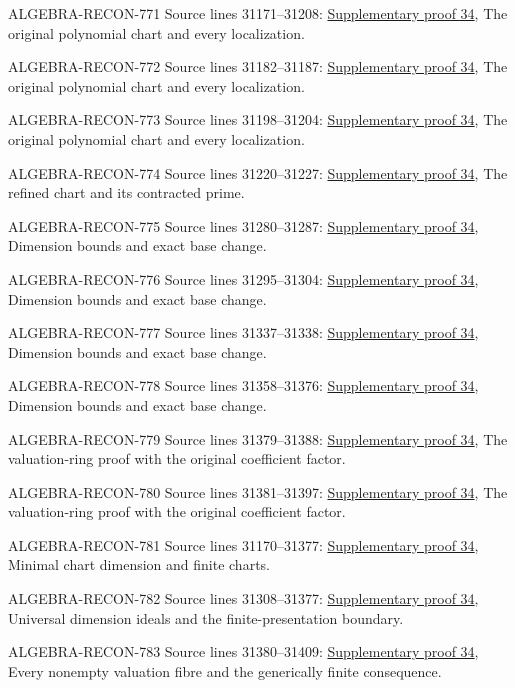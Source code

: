 \begin{AlgebraSourceRoutes}
\item[ALGEBRA-RECON-771] Source lines 31171--31208: \hyperlink{algebra_fibre_dimension_notes_20260928}{Supplementary proof 34}, The original polynomial chart and every localization.
\item[ALGEBRA-RECON-772] Source lines 31182--31187: \hyperlink{algebra_fibre_dimension_notes_20260928}{Supplementary proof 34}, The original polynomial chart and every localization.
\item[ALGEBRA-RECON-773] Source lines 31198--31204: \hyperlink{algebra_fibre_dimension_notes_20260928}{Supplementary proof 34}, The original polynomial chart and every localization.
\item[ALGEBRA-RECON-774] Source lines 31220--31227: \hyperlink{algebra_fibre_dimension_notes_20260928}{Supplementary proof 34}, The refined chart and its contracted prime.
\item[ALGEBRA-RECON-775] Source lines 31280--31287: \hyperlink{algebra_fibre_dimension_notes_20260928}{Supplementary proof 34}, Dimension bounds and exact base change.
\item[ALGEBRA-RECON-776] Source lines 31295--31304: \hyperlink{algebra_fibre_dimension_notes_20260928}{Supplementary proof 34}, Dimension bounds and exact base change.
\item[ALGEBRA-RECON-777] Source lines 31337--31338: \hyperlink{algebra_fibre_dimension_notes_20260928}{Supplementary proof 34}, Dimension bounds and exact base change.
\item[ALGEBRA-RECON-778] Source lines 31358--31376: \hyperlink{algebra_fibre_dimension_notes_20260928}{Supplementary proof 34}, Dimension bounds and exact base change.
\item[ALGEBRA-RECON-779] Source lines 31379--31388: \hyperlink{algebra_fibre_dimension_notes_20260928}{Supplementary proof 34}, The valuation-ring proof with the original coefficient factor.
\item[ALGEBRA-RECON-780] Source lines 31381--31397: \hyperlink{algebra_fibre_dimension_notes_20260928}{Supplementary proof 34}, The valuation-ring proof with the original coefficient factor.
\item[ALGEBRA-RECON-781] Source lines 31170--31377: \hyperlink{algebra_fibre_dimension_notes_20260928}{Supplementary proof 34}, Minimal chart dimension and finite charts.
\item[ALGEBRA-RECON-782] Source lines 31308--31377: \hyperlink{algebra_fibre_dimension_notes_20260928}{Supplementary proof 34}, Universal dimension ideals and the finite-presentation boundary.
\item[ALGEBRA-RECON-783] Source lines 31380--31409: \hyperlink{algebra_fibre_dimension_notes_20260928}{Supplementary proof 34}, Every nonempty valuation fibre and the generically finite consequence.
\end{AlgebraSourceRoutes}

